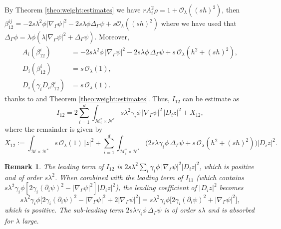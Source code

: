 \documentclass[11pt,oneside,leqno]{amsart}
\numberwithin{equation}{section}
\numberwithin{equation}{section}
\newtheorem{remark}[theorem]{Remark}
\begin{document}
By Theorem \ref{theo:weight:estimates} we have $rA_{i}^{2}\rho=1+\mathcal{O}_{\lambda}((sh)^{2})$, then  $\beta_{12}^{ij}=-2s\lambda^{2}\phi|\nabla_{\Gamma}\psi|^{2}-2s\lambda\phi\Delta_{\Gamma} \psi+s\mathcal{O}_{\lambda}((sh)^{2})$ where we have used that $\Delta_{\Gamma}\phi=\lambda\phi(\lambda|\nabla_{\Gamma}\psi|^{2}+\Delta_{\Gamma}\psi)$. 
Moreover,
\begin{equation}\label{eq:beta12:derived}
    \begin{split}
        A_{i}(\beta_{12}^{i})&=-2s\lambda^{2}\phi\,|\nabla_{\Gamma}\psi|^{2}
        -2s\lambda\phi\,\Delta_{\Gamma}\psi+s\,\mathcal{O}_{\lambda}(h^{2}+(sh)^{2}),\\
        D_{i}(\beta_{12}^{i})&=s\,\mathcal{O}_{\lambda}(1),\\
        D_{i}(\gamma_{i}D_{i}\beta_{12}^{i})&=s\,\mathcal{O}_{\lambda}(1).
    \end{split}
\end{equation}
thanks to \cite[Lemma 2.1]{LDOP-2021} and Theorem \ref{theo:weight:estimates}. Thus, $I_{12}$ can be estimate as
\begin{equation}\label{eq:I12:final}
    I_{12}=2\sum_{i=1}^{d}\int_{\mathcal{M}_{i}^{\ast}\times\mathcal{N}^{\ast}}s\lambda^{2}
    \gamma_{i}\phi\,|\nabla_{\Gamma}\psi|^{2}\,|D_{i}z|^{2}+X_{12},
\end{equation}
where the remainder is given by
\begin{equation}\label{eq:X12}
    X_{12}:=\int_{\mathcal{M}\times\mathcal{N}^{\ast}}s\,\mathcal{O}_{\lambda}(1)\,|z|^{2}
    +\sum_{i=1}^{d}\int_{\mathcal{M}_{i}^{\ast}\times\mathcal{N}^{\ast}}
    \Big(2s\lambda\gamma_{i}\phi\,\Delta_{\Gamma}\psi
    +s\,\mathcal{O}_{\lambda}(h^{2}+(sh)^{2})\Big)|D_{i}z|^{2}.
\end{equation}

\begin{remark}
The leading term of $I_{12}$ is
$2s\lambda^{2}\sum_{i}\gamma_{i}\phi\,|\nabla_{\Gamma}\psi|^{2}|D_{i}z|^{2}$,
which is positive and of order $s\lambda^{2}$.
When combined with the leading term of $I_{11}$
(which contains
$s\lambda^{2}\gamma_{i}\phi[2\gamma_{i}(\partial_{i}\psi)^{2}
-|\nabla_{\Gamma}\psi|^{2}]|D_{i}z|^{2}$),
the leading coefficient of $|D_{i}z|^{2}$ becomes
\begin{equation*}
    s\lambda^{2}\gamma_{i}\phi
    \Big[2\gamma_{i}(\partial_{i}\psi)^{2}
    -|\nabla_{\Gamma}\psi|^{2}+2|\nabla_{\Gamma}\psi|^{2}\Big]
    =s\lambda^{2}\gamma_{i}\phi
    \Big[2\gamma_{i}(\partial_{i}\psi)^{2}
    +|\nabla_{\Gamma}\psi|^{2}\Big],
\end{equation*}
which is positive. The sub-leading term $2s\lambda\gamma_{i}\phi\,\Delta_{\Gamma}\psi$
is of order $s\lambda$ and is absorbed for $\lambda$ large.
\end{remark}
\end{document}

